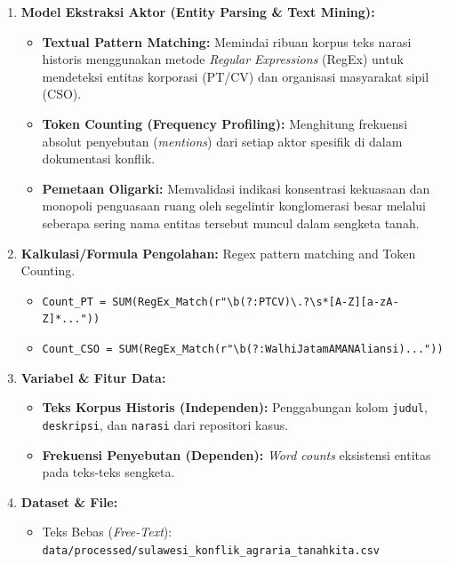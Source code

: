 \documentclass[
]{article}
\providecommand{\tightlist}{%
  \setlength{\itemsep}{0pt}\setlength{\parskip}{0pt}}
\begin{document}
\begin{enumerate}
\def\labelenumi{\arabic{enumi}.}
\tightlist
\item
  \textbf{Model Ekstraksi Aktor (Entity Parsing \& Text Mining):}

  \begin{itemize}
  \tightlist
  \item
    \textbf{Textual Pattern Matching:} Memindai ribuan korpus teks
    narasi historis menggunakan metode \emph{Regular Expressions}
    (RegEx) untuk mendeteksi entitas korporasi (PT/CV) dan organisasi
    masyarakat sipil (CSO).
  \item
    \textbf{Token Counting (Frequency Profiling):} Menghitung frekuensi
    absolut penyebutan (\emph{mentions}) dari setiap aktor spesifik di
    dalam dokumentasi konflik.
  \item
    \textbf{Pemetaan Oligarki:} Memvalidasi indikasi konsentrasi
    kekuasaan dan monopoli penguasaan ruang oleh segelintir konglomerasi
    besar melalui seberapa sering nama entitas tersebut muncul dalam
    sengketa tanah.
  \end{itemize}
\item
  \textbf{Kalkulasi/Formula Pengolahan:} Regex pattern matching and
  Token Counting.

  \begin{itemize}
  \tightlist
  \item
    \texttt{Count\_PT\ =\ SUM(RegEx\_Match(r"\textbackslash{}b(?:PT\textbar{}CV)\textbackslash{}.?\textbackslash{}s*{[}A-Z{]}{[}a-zA-Z{]}*..."))}
  \item
    \texttt{Count\_CSO\ =\ SUM(RegEx\_Match(r"\textbackslash{}b(?:Walhi\textbar{}Jatam\textbar{}AMAN\textbar{}Aliansi)..."))}
  \end{itemize}
\item
  \textbf{Variabel \& Fitur Data:}

  \begin{itemize}
  \tightlist
  \item
    \textbf{Teks Korpus Historis (Independen):} Penggabungan kolom
    \texttt{judul}, \texttt{deskripsi}, dan \texttt{narasi} dari
    repositori kasus.
  \item
    \textbf{Frekuensi Penyebutan (Dependen):} \emph{Word counts}
    eksistensi entitas pada teks-teks sengketa.
  \end{itemize}
\item
  \textbf{Dataset \& File:}

  \begin{itemize}
  \tightlist
  \item
    Teks Bebas (\emph{Free-Text}):
    \texttt{data/processed/sulawesi\_konflik\_agraria\_tanahkita.csv}
  \end{itemize}
\end{enumerate}
\end{document}
